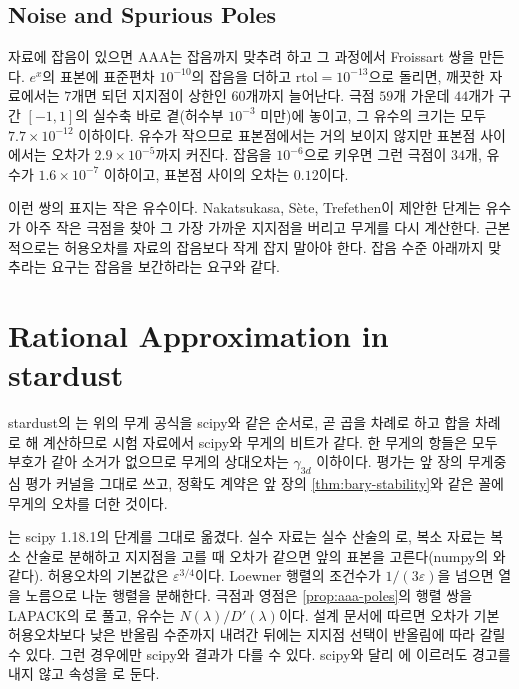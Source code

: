 \subsection{Noise and Spurious Poles}

자료에 잡음이 있으면 AAA는 잡음까지 맞추려 하고 그 과정에서 Froissart 쌍을 만든다. $e^x$의 표본에 표준편차 $10^{-10}$의 잡음을 더하고 $\mathrm{rtol}=10^{-13}$으로 돌리면, 깨끗한 자료에서는 $7$개면 되던 지지점이 상한인 $60$개까지 늘어난다. 극점 $59$개 가운데 $44$개가 구간 $[-1,1]$의 실수축 바로 곁(허수부 $10^{-3}$ 미만)에 놓이고, 그 유수의 크기는 모두 $7.7\times10^{-12}$ 이하이다. 유수가 작으므로 표본점에서는 거의 보이지 않지만 표본점 사이에서는 오차가 $2.9\times10^{-5}$까지 커진다. 잡음을 $10^{-6}$으로 키우면 그런 극점이 $34$개, 유수가 $1.6\times10^{-7}$ 이하이고, 표본점 사이의 오차는 $0.12$이다.

이런 쌍의 표지는 작은 유수이다. Nakatsukasa, Sète, Trefethen이 제안한  단계는 유수가 아주 작은 극점을 찾아 그 가장 가까운 지지점을 버리고 무게를 다시 계산한다\cite{nakatsukasa2018aaa}. 근본적으로는 허용오차를 자료의 잡음보다 작게 잡지 말아야 한다. 잡음 수준 아래까지 맞추라는 요구는 잡음을 보간하라는 요구와 같다.

\section{Rational Approximation in stardust}
\label{sec:rational-stardust}

\begin{instardust}
stardust의 는 위의 무게 공식을 scipy와 같은 순서로, 곧 곱을 차례로 하고 합을 차례로 해 계산하므로 시험 자료에서 scipy와 무게의 비트가 같다. 한 무게의 항들은 모두 부호가 같아 소거가 없으므로 무게의 상대오차는 $\gamma_{3d}$ 이하이다. 평가는 앞 장의 무게중심 평가 커널을 그대로 쓰고, 정확도 계약은 앞 장의 \cref{thm:bary-stability}와 같은 꼴에 무게의 오차를 더한 것이다.
\end{instardust}

\begin{instardust}
는 scipy 1.18.1의 단계를 그대로 옮겼다. 실수 자료는 실수 산술의 로, 복소 자료는 복소 산술로 분해하고 지지점을 고를 때 오차가 같으면 앞의 표본을 고른다(numpy의 와 같다). 허용오차의 기본값은 $\varepsilon^{3/4}$이다. Loewner 행렬의 조건수가 $1/(3\varepsilon)$을 넘으면 열을 노름으로 나눈 행렬을 분해한다. 극점과 영점은 \cref{prop:aaa-poles}의 행렬 쌍을 LAPACK의 로 풀고, 유수는 $N(\lambda)/D'(\lambda)$이다. 설계 문서에 따르면 오차가 기본 허용오차보다 낮은 반올림 수준까지 내려간 뒤에는 지지점 선택이 반올림에 따라 갈릴 수 있다. 그런 경우에만 scipy와 결과가 다를 수 있다. scipy와 달리 에 이르러도 경고를 내지 않고  속성을 로 둔다.
\end{instardust}

